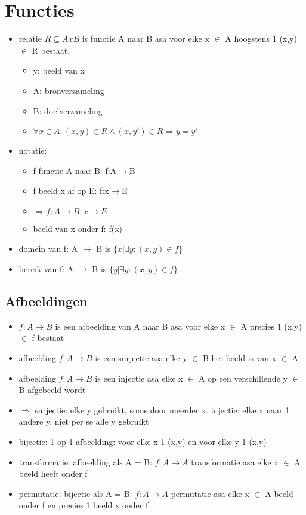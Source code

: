 \documentclass{article}
\begin{document}
\section{Functies}
\begin{itemize}
    \item relatie $R \subseteq A x B$ is functie A naar B asa voor elke x $\in$ A hoogstens 1 (x,y) $\in$ R bestaat.
    \begin{itemize}
        \item y: beeld van x
        \item A: bronverzameling
        \item B: doelverzameling
        \item $\forall x \in A: (x,y) \in R \land (x,y') \in R \Rightarrow y = y'$
    \end{itemize}
    \item notatie:
    \begin{itemize}
        \item f functie A naar B: f:A$\rightarrow$B
        \item f beeld x af op E: f:x$\mapsto$E
        \item $\Rightarrow f:A \rightarrow B: x \mapsto E$
        \item beeld van x onder f: f(x)
    \end{itemize}
    \item domein van f: A $\rightarrow$ B is $\{x| \exists y: (x,y) \in f\}$
    \item bereik van f: A $\rightarrow$ B is $\{y| \exists y: (x,y) \in f\}$
\end{itemize}

\subsection{Afbeeldingen}
\begin{itemize}
    \item $f: A \rightarrow B$ is een afbeelding van A naar B asa voor elke x $\in$ A precies 1 (x,y) $\in$ f bestaat
    \item afbeelding $f: A \rightarrow B$ is een surjectie asa elke y $\in$ B het beeld is van x $\in$ A
    \item afbeelding $f: A \rightarrow B$ is een injectie asa elke x $\in$ A op een verschillende y $\in$ B afgebeeld wordt
    \item \quad $\Rightarrow$ surjectie: elke y gebruikt, soms door meerder x. injectie: elke x naar 1 andere y, niet per se alle y gebruikt
    \item bijectie: 1-op-1-afbeelding: voor elke x 1 (x,y) en voor elke y 1 (x,y)
    \item transformatie: afbeelding als A = B: $f: A \rightarrow A$ transformatie asa elke x $\in$ A beeld  heeft onder f
    \item permutatie: bijectie als A = B: $f: A \rightarrow A$ permutatie asa elke x $\in$ A beeld onder f en precies 1 beeld x onder f
\end{itemize}
\end{document}
